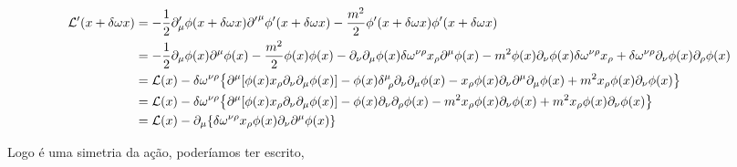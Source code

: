 \documentclass[twoside]{amsart}
\numberwithin{equation}{section}
\begin{document}
\begin{align}
    \mathcal L'\qty(x+\delta\omega x)&=-\frac12\partial_\mu'\phi\qty(x+\delta \omega x){\partial'}^\mu\phi'\qty(x+\delta\omega x)-\frac{m^2}{2}\phi'\qty(x+\delta\omega x)\phi'\qty(x+\delta \omega x)\\
    &=-\frac12\partial_\mu\phi\qty(x)\partial^\mu\phi\qty(x)-\frac{m^2}{2}\phi\qty(x)\phi\qty(x)-\partial_\nu\partial_\mu\phi\qty(x)\delta\omega^{\nu\rho}x_{\rho}\partial^\mu\phi\qty(x)-m^2\phi\qty(x)\partial_\nu\phi\qty(x)\delta\omega^{\nu\rho}x_{\rho}+\delta\omega^{\nu\rho}\partial_\nu\phi\qty(x)\partial_\rho\phi\qty(x)\\
    &=\mathcal L\qty(x)-\delta\omega^{\nu\rho}\qty{\partial^\mu\qty[\phi\qty(x)x_\rho\partial_\nu\partial_\mu\phi\qty(x)]-\phi\qty(x)\delta^{\mu}_{\ \rho}\partial_\nu\partial_\mu\phi\qty(x)-x_\rho\phi\qty(x)\partial_\nu\partial^\mu\partial_\mu\phi\qty(x)+m^2x_\rho\phi\qty(x)\partial_\nu\phi\qty(x)}\\
    &=\mathcal L\qty(x)-\delta\omega^{\nu\rho}\qty{\partial^\mu\qty[\phi\qty(x)x_\rho\partial_\nu\partial_\mu\phi\qty(x)]-\phi\qty(x)\partial_\nu\partial_\rho\phi\qty(x)-m^2x_\rho\phi\qty(x)\partial_\nu\phi\qty(x)+m^2x_\rho\phi\qty(x)\partial_\nu\phi\qty(x)}\\
    &=\mathcal L\qty(x)-\partial_\mu\qty{\delta\omega^{\nu\rho}x_\rho\phi\qty(x)\partial_\nu\partial^\mu\phi\qty(x)}
\end{align}

Logo é uma simetria da ação, poderíamos ter escrito,
\end{document}

